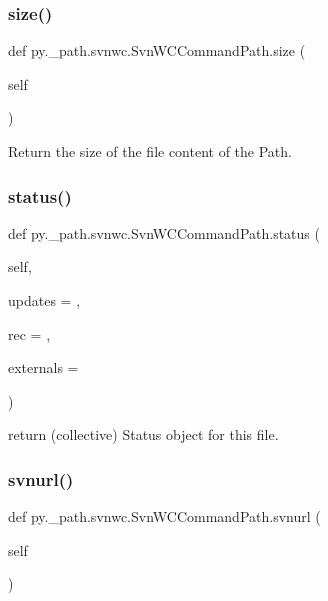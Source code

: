 \subsubsection{\texorpdfstring{size()}{size()}}
{\footnotesize\ttfamily def py.\+\_\+path.\+svnwc.\+Svn\+W\+C\+Command\+Path.\+size (\begin{DoxyParamCaption}\item[{}]{self }\end{DoxyParamCaption})}

\begin{DoxyVerb}Return the size of the file content of the Path. \end{DoxyVerb}
 \mbox{\label{classpy_1_1__path_1_1svnwc_1_1_svn_w_c_command_path_a904342dc428d4304962544061cf44473}} 
\subsubsection{\texorpdfstring{status()}{status()}}
{\footnotesize\ttfamily def py.\+\_\+path.\+svnwc.\+Svn\+W\+C\+Command\+Path.\+status (\begin{DoxyParamCaption}\item[{}]{self,  }\item[{}]{updates = {},  }\item[{}]{rec = {},  }\item[{}]{externals = {} }\end{DoxyParamCaption})}

\begin{DoxyVerb}return (collective) Status object for this file. \end{DoxyVerb}
 \mbox{\label{classpy_1_1__path_1_1svnwc_1_1_svn_w_c_command_path_a395da4e38842efbc0d5b5b6997783423}} 
\subsubsection{\texorpdfstring{svnurl()}{svnurl()}}
{\footnotesize\ttfamily def py.\+\_\+path.\+svnwc.\+Svn\+W\+C\+Command\+Path.\+svnurl (\begin{DoxyParamCaption}\item[{}]{self }\end{DoxyParamCaption})}

